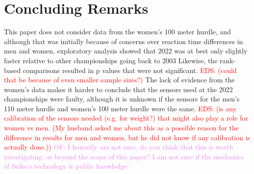 \documentclass[12pt, letterpaper, titlepage]{article}
\newcommand{\eds}[1]{\textcolor{red}{EDS: (#1)}}
\newcommand{\of}[1]{\textcolor{violet}{OF: #1}}
\begin{document}
\section{Concluding Remarks}\label{sec:concludingremarks}



This paper does not consider data from the women's 100 meter hurdle, and although
that was initially because of concerns over reaction time differences in men and
women, exploratory analysis showed that 2022 was at best only
slightly faster relative to other championships going back to 2003 
Likewise, the rank-based comparisons resulted in p values
that were not significant. 
\eds{could that be because of even smaller sample sizes?}
  The lack of evidence from the women's data makes it 
harder to conclude that the sensors used at the 2022 championships were faulty, 
although it is unknown if the sensors for the men's 110 meter hurdle and women's
100 meter hurdle were the same.  
\eds{is any calibration of the sensors needed (e.g. for weight?) that might
also play a role for women vs men. (My husband asked me about this as a possible 
reason for the difference in results for men and women, but he did not know
if any calibration is actually done.)}
\of{I honestly am not sure, do you think that this is worth investigating, or
beyond the scope of this paper? I am not sure if the mechanics of Seiko's
technology is public knowledge.}
\end{document}
